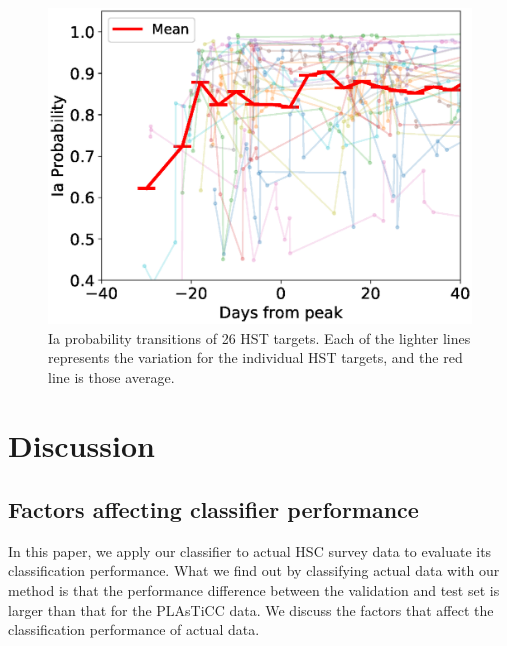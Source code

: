 \documentclass[useamsfonts]{pasj01}
\begin{document}
%
%
\begin{figure}[htbp]
  \begin{center}
     \includegraphics[width=\columnwidth]{figures/HST_DaysFromPeak_vs_IaProbability_200319.eps}
  \end{center}
  \caption{%
  Ia probability transitions of 26 HST targets. Each of the lighter lines represents the variation for the individual HST targets, and the red line is those average.
  }%
  \label{fig:HSTIaprob}
\end{figure}
%
%
\section{Discussion}
%
\subsection{Factors affecting classifier performance}
%
In this paper, we apply our classifier to actual HSC survey data to evaluate its classification performance.
What we find out by classifying actual data with our method is that the performance difference between the validation and test set is larger than that for the PLAsTiCC data.
We discuss the factors that affect the classification performance of actual data.
\end{document}

